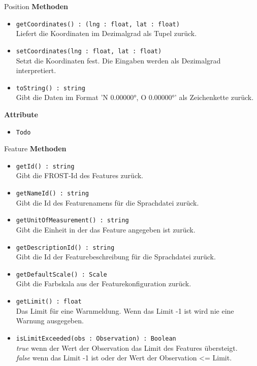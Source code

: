     \begin{Class}{Position}
        \textbf{Methoden}
        \begin{itemize}
            \item \texttt{getCoordinates() : (lng : float, lat : float)}
            \\ Liefert die Koordinaten im Dezimalgrad als Tupel zurück.
            \item \texttt{setCoordinates(lng : float, lat : float)}
            \\ Setzt die Koordinaten fest. Die Eingaben werden als Dezimalgrad interpretiert.

            \item \texttt{toString() : string}
            \\ Gibt die Daten im Format 'N 0.00000°, O 0.00000°' als Zeichenkette zurück.
        \end{itemize}
        
        \textbf{Attribute}
        \begin{itemize}
            \item \texttt{Todo}
        \end{itemize}
    \end{Class}

    \begin{Class}{Feature}
        \textbf{Methoden}
        \begin{itemize}
            \item \texttt{getId() : string}
            \\ Gibt die FROST-Id des Features zurück.
            \item \texttt{getNameId() : string}
            \\ Gibt die Id des Featurenamens für die Sprachdatei zurück.
            \item \texttt{getUnitOfMeasurement() : string}
            \\ Gibt die Einheit in der das Feature angegeben ist zurück.
            \item \texttt{getDescriptionId() : string}
            \\ Gibt die Id der Featurebeschreibung für die Sprachdatei zurück.
            \item \texttt{getDefaultScale() : Scale}
            \\ Gibt die Farbskala aus der Featurekonfiguration zurück.
            \item \texttt{getLimit() : float}
            \\ Das Limit für eine Warnmeldung. Wenn das Limit -1 ist wird nie eine Warnung ausgegeben.
            \item \texttt{isLimitExceeded(obs : Observation) : Boolean}
            \\ \emph{true} wenn der Wert der Observation das Limit des Features übersteigt.
            \\ \emph{false} wenn das Limit -1 ist oder der Wert der Observation <= Limit.
        \end{itemize}
    \end{Class}


